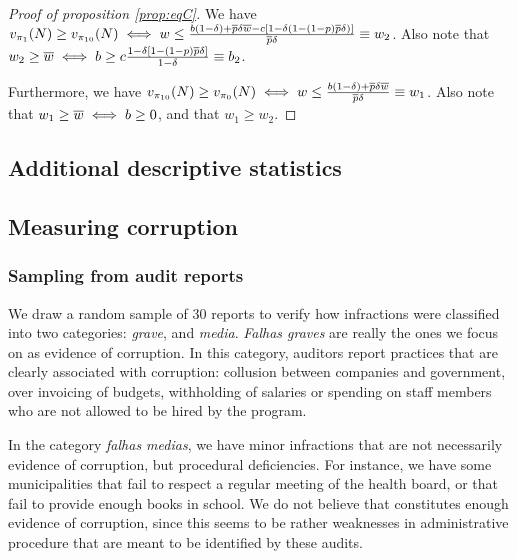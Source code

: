 {\begin{proof}[Proof of proposition \ref{prop:eqC}]
    We have $v_{\pi_1}(N) \geq v_{\pi_{10}}(N) \iff w \leq \frac{b(1-\delta)+\overline{p}\delta\overline{w}-c[1-\delta(1-(1-p)\overline{p}\delta)]}{\overline{p}\delta}  \equiv w_2$. Also note that $w_2 \geq \overline{w} \iff b \geq c \frac{1-\delta[1-(1-p)\overline{p}\delta]}{1-\delta} \equiv b_2$. 

    Furthermore, we have $v_{\pi_{10}}(N) \geq v_{\pi_0}(N) \iff w \leq \frac{b(1-\delta)+\overline{p}\delta\overline{w}}{\overline{p}\delta}\equiv w_1$. Also note that $w_1 \geq \overline{w} \iff b \geq 0$, and that $w_1 \geq w_2$.  

\end{proof}

\subsection{Additional descriptive statistics}
\label{app:descriptives}

\subsection{Measuring corruption}
\label{app:fault}

\subsubsection*{Sampling from audit reports} 

We draw a random sample of 30 reports to verify how infractions were classified into two categories: \textit{grave}, and \textit{media}. \textit{Falhas graves} are really the ones we focus on as evidence of corruption. In this category, auditors report practices that are clearly associated with corruption: collusion between companies and government, over invoicing of budgets, withholding of salaries or spending on staff members who are not allowed to be hired by the program.

In the category \textit{falhas medias}, we have minor infractions that are not necessarily evidence of corruption, but procedural deficiencies. For instance, we have  some municipalities that fail to respect a regular meeting of the health board, or that fail to provide enough books in school. We do not believe that constitutes enough evidence of corruption, since this seems to be rather weaknesses in administrative procedure that are meant to be identified by these audits.

}
